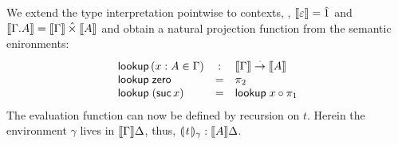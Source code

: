 \documentclass[a4paper,USenglish,cleveref, autoref]{lipics-v2019}
\begin{document}
We extend the type interpretation pointwise to contexts, \ie,
$\den \cempty = \hatone$ and
$\den{\cext \Gamma A} = \den \Gamma \hattimes \den A$
and obtain a natural projection function from the semantic enironments:
\[
\begin{array}{lcl}
  \tlookup\,(x : A \in \Gamma) & : &  \den \Gamma \todot \den A \\
  \tlookup\;\tzero     & = & \pi_2 \\
  \tlookup\;(\tsuc\,x) & = & \tlookup\;x \comp \pi_1 \\
\end{array}
\]
The evaluation function
can now be defined by recursion on $t$.
Herein the environment $\gamma$ lives in $\den \Gamma \Delta$, thus, $\dent t \gamma : \den A \Delta$.
\end{document}

